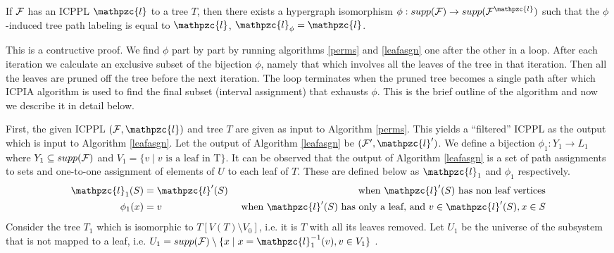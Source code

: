 \documentclass{fsttcs}
\def\cF{{\cal F}}
\def\cl{\mathpzc{l}}
\begin{document}
\begin{theorem}
\label{th:perm}
  If $\cF$ has an ICPPL $\cl$ to a tree $T$, then there exists a hypergraph
  isomorphism $\phi : supp(\cF) \rightarrow supp(\cF^\cl)$ such that
  the $\phi$-induced tree path labeling is equal to $\cl$, $\cl_\phi = \cl$.
\end{theorem}
\proof This is a contructive proof. We find $\phi$ part by part by
running algorithms \ref{perms} and \ref{leafasgn} one after the other
in a loop. After each iteration we calculate an exclusive subset of
the bijection $\phi$, namely that which involves all the leaves of the
tree in that iteration. Then all the leaves are pruned off the tree
before the next iteration. The loop terminates when the pruned tree
becomes a single path after which ICPIA algorithm is used to find the
final subset (interval assignment) that exhausts $\phi$. This is
the brief outline of the algorithm and now we describe it in detail
below.
  

\noindent
First, the given ICPPL $(\cF, \cl)$ and tree $T$ are given as input to
Algorithm \ref{perms}. This yields a ``filtered'' ICPPL as the output
which is input to Algorithm \ref{leafasgn}.  Let the output of
Algorithm \ref{leafasgn} be $(\cF',\cl')$. We define a bijection
$\phi_1: Y_1 \rightarrow L_1$ where $Y_1 \subseteq supp(\cF)$ and $V_1
= \{v \mid v \text{ is a leaf in } $T$\}$.  It can be observed that
the output of Algorithm \ref{leafasgn} is a set of path assignments to
sets and one-to-one assignment of elements of $U$ to each leaf of
$T$. These are defined below as $\cl_1$ and $\phi_1$ respectively.
\vspace{-3mm}
\begin{align*}
  \cl_1(S) &= \cl'(S) &\text{ when $\cl'(S)$ has non leaf vertices} \\
  \phi_1(x) &= v  &\text{ when $\cl'(S)$ has only a leaf, and } v \in \cl'(S), x \in S
\end{align*}
Consider the tree $T_1$ which is isomorphic to $T[V(T) \setminus
V_0]$, i.e. it is $T$ with all its leaves removed. Let $U_1$ be the
universe of the subsystem that is not mapped to a leaf, i.e. $U_1 =
supp(\cF) \setminus \{ x \mid x = \cl_1^{-1}(v), v \in V_1\}$ .
\end{document}
